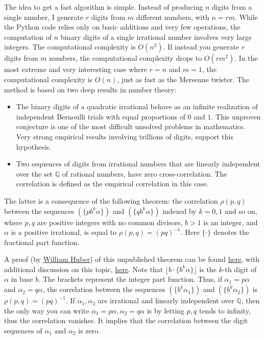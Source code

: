 \documentclass[oneside,10pt]{book}
\begin{document}
The idea to get a fast algorithm is simple. Instead of producing $n$ digits from a single number, I generate 
 $r$ digits from $m$ different numbers, with $n=rm$. While the Python code relies only on basic additions and very
 few operations, the computation of $n$ binary digits of a single irrational number involves very large integers. The  
\textcolor{index}{computational  complexity} is $O(n^2)$. If instead you
 generate $r$ digits from $m$ numbers, the computational complexity drops to $O(rm^2)$. In the most extreme and very interesting case where $r=n$ and $m=1$, the computational complexity is $O(n)$, just as fast as the Mersenne twister. 
The method is based on two deep results in number theory:
\begin{itemize}
\item The binary digits of a quadratic irrational behave as an infinite realization of independent Bernoulli trials with equal proportions of $0$ and $1$. This unproven conjecture is one of the most difficult unsolved problems in mathematics. Very strong empirical results involving trillions of digits, support this hypothesis.
\item Two sequences of digits from irrational numbers that are linearly independent over the set 
$\mathbb{Q}$ of rational numbers,
 have zero cross-correlation. The correlation is defined as the empirical correlation in this case.
\end{itemize}
The latter is a consequence of the following theorem: the correlation $\rho(p,q)$ between the sequences
 $(\{p b^k\alpha\})$ and $(\{q b^k\alpha\})$ indexed by $k=0,1$ and so on, where $p,q$ are positive integers with no common divisors, $b > 1$ is an integer, and $\alpha$ is a positive irrational, is equal to $\rho(p,q) = (pq)^{-1}$. Here $\{\cdot\}$ denotes the fractional part function. 

A proof (by \href{https://www.analysisandinference.com/team/william-a-huber-phd}{William Huber}) of this unpublished theorem  can be found \href{https://stats.stackexchange.com/questions/422354/correlations-between-two-sequences-of-irrational-numbers}{here}, with additional discussion on this topic, \href{https://stats.stackexchange.com/questions/450922/cross-correlations-in-digit-distributions}{here}. 
Note that $\lfloor b \cdot \{b^k \alpha\}\rfloor$ is the $k$-th digit of $\alpha$ in base $b$. The brackets represent the integer part function. Thus, if $\alpha_1=p\alpha$ and $\alpha_2=q\alpha$, the correlation between the sequences
 $(\{b^k \alpha_1\})$ and $(\{b^k \alpha_2\})$ is $\rho(p,q)=(pq)^{-1}$. If $\alpha_1,\alpha_2$ are irrational and 
 linearly independent over $\mathbb{Q}$,
 then the only way you can write $\alpha_1=p\alpha,\alpha_2=q\alpha$ is by letting $p,q$ tends to infinity, thus the correlation vanishes. It implies that the correlation between the digit sequences of $\alpha_1$ and $\alpha_2$ is zero.
\end{document}
